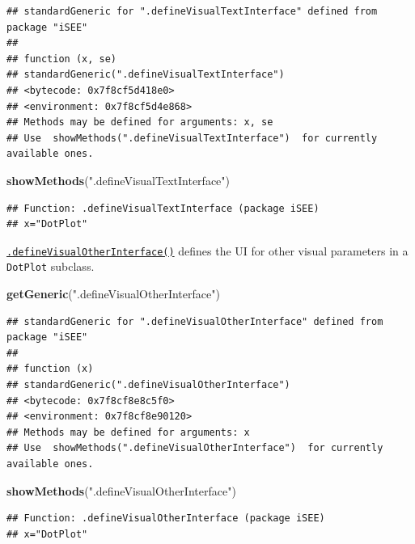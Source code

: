 \documentclass[
]{book}
\newenvironment{Shaded}{\begin{snugshade}}{\end{snugshade}}
\newcommand{\KeywordTok}[1]{\textcolor[rgb]{0.13,0.29,0.53}{\textbf{#1}}}
\newcommand{\NormalTok}[1]{#1}
\newcommand{\StringTok}[1]{\textcolor[rgb]{0.31,0.60,0.02}{#1}}
\begin{document}
\begin{verbatim}
## standardGeneric for ".defineVisualTextInterface" defined from package "iSEE"
## 
## function (x, se) 
## standardGeneric(".defineVisualTextInterface")
## <bytecode: 0x7f8cf5d418e0>
## <environment: 0x7f8cf5d4e868>
## Methods may be defined for arguments: x, se
## Use  showMethods(".defineVisualTextInterface")  for currently available ones.
\end{verbatim}

\begin{Shaded}
\begin{Highlighting}[]
\KeywordTok{showMethods}\NormalTok{(}\StringTok{".defineVisualTextInterface"}\NormalTok{)}
\end{Highlighting}
\end{Shaded}

\begin{verbatim}
## Function: .defineVisualTextInterface (package iSEE)
## x="DotPlot"
\end{verbatim}

\href{https://isee.github.io/iSEE/reference/visual-parameters-generics.html}{\texttt{.defineVisualOtherInterface()}} defines the UI for other visual parameters in a \texttt{DotPlot} subclass.

\begin{Shaded}
\begin{Highlighting}[]
\KeywordTok{getGeneric}\NormalTok{(}\StringTok{".defineVisualOtherInterface"}\NormalTok{)}
\end{Highlighting}
\end{Shaded}

\begin{verbatim}
## standardGeneric for ".defineVisualOtherInterface" defined from package "iSEE"
## 
## function (x) 
## standardGeneric(".defineVisualOtherInterface")
## <bytecode: 0x7f8cf8e8c5f0>
## <environment: 0x7f8cf8e90120>
## Methods may be defined for arguments: x
## Use  showMethods(".defineVisualOtherInterface")  for currently available ones.
\end{verbatim}

\begin{Shaded}
\begin{Highlighting}[]
\KeywordTok{showMethods}\NormalTok{(}\StringTok{".defineVisualOtherInterface"}\NormalTok{)}
\end{Highlighting}
\end{Shaded}

\begin{verbatim}
## Function: .defineVisualOtherInterface (package iSEE)
## x="DotPlot"
\end{verbatim}
\end{document}
